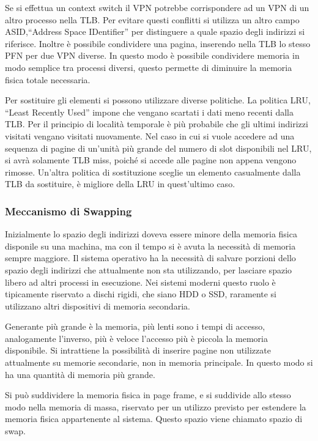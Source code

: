 \documentclass{article}
\numberwithin{equation}{subsection}
\begin{document}

Se si effettua un context switch il VPN potrebbe corrispondere ad un VPN di un altro processo nella TLB. Per evitare questi conflitti si utilizza un altro campo 
ASID,``Address Space IDentifier'' per distinguere a quale spazio degli indirizzi si riferisce. Inoltre è possibile condividere una pagina, inserendo nella TLB lo 
stesso PFN per due VPN diverse. In questo modo è possibile condividere memoria in modo semplice tra processi diversi, questo permette di diminuire la memoria 
fisica totale necessaria. 

Per sostituire gli elementi si possono utilizzare diverse politiche. La politica LRU, ``Least Recently Used'' impone che vengano scartati i dati meno recenti dalla 
TLB. Per il principio di località temporale è più probabile che gli ultimi indirizzi visitati vengano visitati nuovamente. Nel caso in cui si vuole accedere ad una 
sequenza di pagine di un'unità più grande del numero di slot disponibili nel LRU, si avrà solamente TLB miss, poiché si accede alle pagine non appena vengono rimosse. 
Un'altra politica di sostituzione sceglie un elemento casualmente dalla TLB da sostituire, è migliore della LRU in quest'ultimo caso. 

\subsubsection{Meccanismo di Swapping}

Inizialmente lo spazio degli indirizzi doveva essere minore della memoria fisica disponile su una machina, ma con il tempo si è avuta la necessità di memoria sempre 
maggiore. Il sistema operativo ha la necessità di salvare porzioni dello spazio degli indirizzi che attualmente non sta utilizzando, per lasciare spazio libero ad 
altri processi in esecuzione. Nei sistemi moderni questo ruolo è tipicamente riservato a dischi rigidi, che siano HDD o SSD, raramente si utilizzano altri 
dispositivi di memoria secondaria. 


Generante più grande è la memoria, più lenti sono i tempi di accesso, analogamente l'inverso, più è veloce l'accesso più è piccola la memoria disponibile. Si intrattiene 
la possibilità di inserire pagine non utilizzate attualmente su memorie secondarie, non in memoria principale. In questo modo si ha una quantità di memoria più grande. 

Si può suddividere la memoria fisica in page frame, e si suddivide allo stesso modo nella memoria di massa, riservato per un utilizzo previsto per estendere la memoria 
fisica appartenente al sistema. Questo spazio viene chiamato spazio di swap. 
\end{document}
